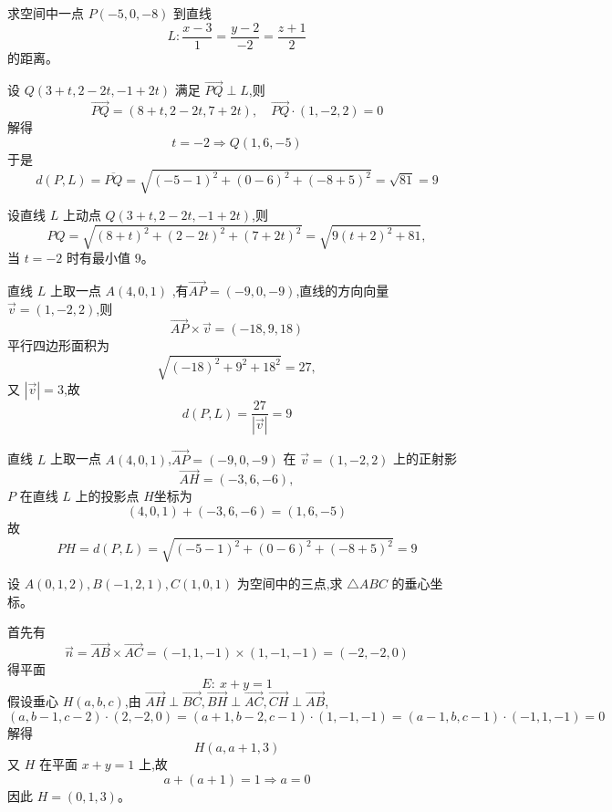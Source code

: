 \begin{questions}
    \question 求空间中一点 $P(-5,0,-8)$ 到直线 
    \[
    L:\frac{x-3}{1}=\frac{y-2}{-2}=\frac{z+1}{2}
    \] 
    的距离。
    \begin{solution}
        设 $Q(3+t,2-2t,-1+2t)$ 满足 $\overrightarrow{PQ} \perp L$,则
        \[
        \overrightarrow{PQ}=(8+t,2-2t,7+2t),\quad \overrightarrow{PQ} \cdot (1,-2,2)=0
        \]
        解得
        \[
        t=-2 \Rightarrow Q(1,6,-5)
        \]
        于是
        \[
        d(P,L)=\overline{PQ}=\sqrt{(-5-1)^{2}+(0-6)^{2}+(-8+5)^{2}}=\sqrt{81}=9
        \]
    \end{solution}
    \begin{solution}
        设直线 $L$ 上动点 $Q(3+t,2-2t,-1+2t)$,则
        \[
        PQ=\sqrt{(8+t)^{2}+(2-2t)^{2}+(7+2t)^{2}}=\sqrt{9(t+2)^{2}+81},
        \]  
        当 $t=-2$ 时有最小值 $9$。
    \end{solution}
    \begin{solution}
        直线 $L$ 上取一点 $A(4,0,1)$ ,有$\overrightarrow{AP}=(-9,0,-9)$,直线的方向向量 $\vec{v}=(1,-2,2)$,则
        \[
        \overrightarrow{AP}\times\vec{v}=(-18,9,18)
        \] 
        平行四边形面积为 
        \[
        \sqrt{(-18)^{2}+9^{2}+18^{2}}=27,
        \] 
        又 $|\vec{v}|=3$,故    
        \[
        d(P,L)=\frac{27}{|\vec{v}|}=9
        \]
    \end{solution}
    \begin{solution}
        直线 $L$ 上取一点 $A(4,0,1)$,$\overrightarrow{AP}=(-9,0,-9)$ 在 $\vec{v}=(1,-2,2)$ 上的正射影 
        \[
        \overrightarrow{AH}=(-3,6,-6),
        \]  
        $P$ 在直线 $L$ 上的投影点 $H$坐标为
        \[
        (4,0,1)+(-3,6,-6)=(1,6,-5)
        \]  
        故
        \[
        PH=d(P,L)=\sqrt{(-5-1)^{2}+(0-6)^{2}+(-8+5)^{2}}=9
        \]
    \end{solution}

    \question 设 $A(0,1,2),B(-1,2,1),C(1,0,1)$ 为空间中的三点,求 $\triangle ABC$ 的垂心坐标。
    \begin{solution}
        首先有
        \[
        \vec n = \overrightarrow{AB} \times \overrightarrow{AC} =(-1,1,-1) \times (1,-1,-1)= (-2,-2,0)
        \]
        得平面
        \[
        E:\ x+y=1
        \]
        假设垂心 $H(a,b,c)$,由 $\overrightarrow{AH} \perp \overrightarrow{BC},\overrightarrow{BH} \perp \overrightarrow{AC},\overrightarrow{CH} \perp \overrightarrow{AB}$,
        \[
        (a,b-1,c-2) \cdot (2,-2,0) = (a+1,b-2,c-1) \cdot (1,-1,-1) = (a-1,b,c-1) \cdot (-1,1,-1) = 0
        \]
        解得 
        \[
        H(a,a+1,3)
        \]
        又 $H$ 在平面 $x+y=1$ 上,故
        \[
        a + (a+1) = 1 \Rightarrow a = 0
        \]
        因此 $H = (0,1,3)$。
    \end{solution}


\end{questions}
